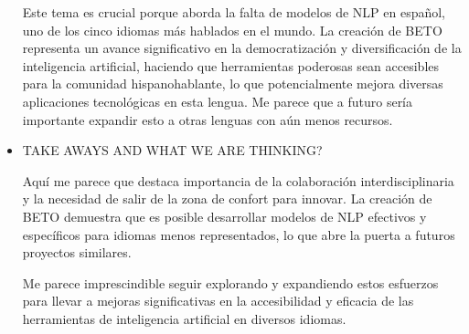 \documentclass[letter, 11pt, twoside]{report}
\begin{document}
\begin{itemize}
    Este tema es crucial porque aborda la falta de modelos de NLP en español, uno de los cinco idiomas más hablados en el mundo. La creación de BETO representa un avance significativo en la democratización y diversificación de la inteligencia artificial, haciendo que herramientas poderosas sean accesibles para la comunidad hispanohablante, lo que potencialmente mejora diversas aplicaciones tecnológicas en esta lengua. Me parece que a futuro sería importante expandir esto a otras lenguas con aún menos recursos.
    \item TAKE AWAYS AND WHAT WE ARE THINKING?
    

    Aquí me parece que destaca importancia de la colaboración interdisciplinaria y la necesidad de salir de la zona de confort para innovar. La creación de BETO demuestra que es posible desarrollar modelos de NLP efectivos y específicos para idiomas menos representados, lo que abre la puerta a futuros proyectos similares.
    
    Me parece imprescindible seguir explorando y expandiendo estos esfuerzos para llevar a mejoras significativas en la accesibilidad y eficacia de las herramientas de inteligencia artificial en diversos idiomas.
\end{itemize}
\end{document}

